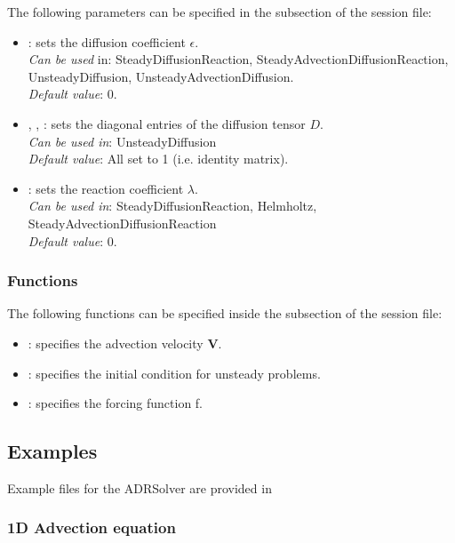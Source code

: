 The following parameters can be specified in the  subsection of
the session file:
\begin{itemize}
\item {}: sets the diffusion coefficient $\epsilon$.\\ 
\textit{Can be used} in: SteadyDiffusionReaction, SteadyAdvectionDiffusionReaction, UnsteadyDiffusion, UnsteadyAdvectionDiffusion. \\
\textit{Default value}: 0.
\item  {}, , : sets the diagonal entries of the
diffusion tensor $D$. \\
\textit{Can be used in}: UnsteadyDiffusion \\
\textit{Default value}: All set to 1 (i.e. identity matrix). 
\item  {}: sets the reaction coefficient  $\lambda$. \\
\textit{Can be used in}: SteadyDiffusionReaction, Helmholtz, SteadyAdvectionDiffusionReaction\\
\textit{Default value}: 0.
\end{itemize}

\subsubsection{Functions}

The following functions can be specified inside the  subsection
of the session file:

\begin{itemize}
\item {}: specifies the advection velocity $\mathbf{V}$.
\item {}: specifies the initial condition for unsteady problems.
\item {}: specifies the forcing function f.
\end{itemize}

\subsection{Examples}
Example files for the ADRSolver are provided in

\subsubsection{1D Advection equation}

